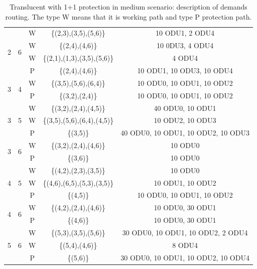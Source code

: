 \begin{table}[h]
\begin{tabular}{||c|c|c|c|c||}
 \multirow{4}{*}{2} & \multirow{4}{*}{6}&W&\{(2,3),(3,5),(5,6)\}& 10 ODU1, 2 ODU4 \\
  & &W& \{(2,4),(4,6)\} & 10 0DU3, 4 ODU4 \\
  & &W& \{(2,1),(1,3),(3,5),(5,6)\} & 4 ODU4 \\
  & &P& \{(2,4),(4,6)\} & 10 ODU1, 10 ODU3, 10 ODU4 \\ \hline
 \multirow{2}{*}{3} & \multirow{2}{*}{4}&W& \{(3,5),(5,6),(6,4)\} & 10 ODU0, 10 ODU1, 10 ODU2 \\
  & &P& \{(3,2),(2,4)\} & 10 ODU0, 10 ODU1, 10 ODU2 \\ \hline
 \multirow{3}{*}{3}&\multirow{3}{*}{5}&W&\{(3,2),(2,4),(4,5)\}&40 ODU0, 10 ODU1 \\
  & &W& \{(3,5),(5,6),(6,4),(4,5)\}& 10 ODU2, 10 ODU3\\
  & &P& \{(3,5)\} & 40 ODU0, 10 ODU1, 10 ODU2, 10 ODU3 \\ \hline
 \multirow{2}{*}{3} & \multirow{2}{*}{6}&W& \{(3,2),(2,4),(4,6)\} & 10 ODU0 \\
  & &P& \{(3,6)\} & 10 ODU0 \\ \hline
 \multirow{3}{*}{4} & \multirow{3}{*}{5}&W& \{(4,2),(2,3),(3,5)\} & 10 ODU0 \\
  & &W& \{(4,6),(6,5),(5,3),(3,5)\} & 10 ODU1, 10 ODU2 \\
  & &P& \{(4,5)\} & 10 ODU0, 10 ODU1, 10 ODU2 \\ \hline
 \multirow{2}{*}{4} & \multirow{2}{*}{6}&W& \{(4,2),(2,4),(4,6)\} & 10 ODU0, 30 ODU1\\
  & &P& \{(4,6)\} & 10 ODU0, 30 ODU1\\ \hline
 \multirow{3}{*}{5} & \multirow{3}{*}{6}&W&\{(5,3),(3,5),(5,6)\}& 30 ODU0, 10 ODU1, 10 ODU2, 2 ODU4 \\
  & &W& \{(5,4),(4,6)\} & 8 ODU4 \\
  & &P& \{(5,6)\}& 30 ODU0, 10 ODU1, 10 ODU2, 10 ODU4 \\ \hline
\end{tabular}
\caption{Translucent with 1+1 protection in medium scenario: description of demands routing. The type W means that it is working path and type P protection path.}
\label{path_transluc_protec_ref_medium}
\end{table}
\newpage

